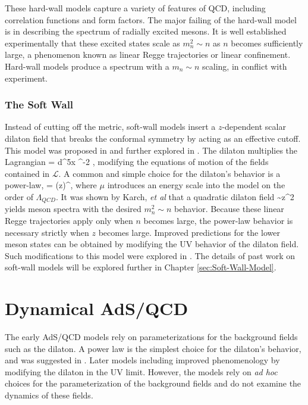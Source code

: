 These hard-wall models capture a variety of features of QCD, including correlation functions and form factors.
The major failing of the hard-wall model is in describing the spectrum of radially excited mesons.
It is well established experimentally that these excited states scale as $m_n^2 \sim n$ as $n$ becomes sufficiently large, a phenomenon known as linear Regge trajectories or linear confinement.
Hard-wall models produce a spectrum with a $m_n \sim n$ scaling, in conflict with experiment.

\subsubsection{The Soft Wall}
Instead of cutting off the metric, soft-wall models insert a $z$-dependent scalar dilaton field that breaks the conformal symmetry by acting as an effective cutoff.
This model was proposed in \cite{karch-katz-son-adsqcd} and further explored in \cite{Evans:2006ea,Grigoryan:2007my,kwee-lebed-pion,Cherman2009,colangelo2008,Huang:2007fv}. 
The dilaton multiplies the Lagrangian
\be
{} = \int d^5x ^{-2\Phi} \root  {},
\ee
modifying the equations of motion of the fields contained in $\mathcal{L}$. 
A common and simple choice for the dilaton's behavior is a power-law,
\be
\Phi = (\mu z)^\nu,
\ee
where $\mu$ introduces an energy scale into the model on the order of $\Lambda_{QCD}$.
It was shown by Karch, \emph{et al} \cite{karch-katz-son-adsqcd} that a quadratic dilaton field
\be
\Phi \sim z^2
\ee
yields meson spectra with the desired $m_n^2 \sim n$ behavior.
Because these linear Regge trajectories apply only when $n$ becomes large, the power-law behavior is necessary strictly when $z$ becomes large.
Improved predictions for the lower meson states can be obtained by modifying the UV behavior of the dilaton field.
Such modifications to this model were explored in \cite{gherghetta-kelley}.
The details of past work on soft-wall models will be explored further in Chapter \ref{sec:Soft-Wall-Model}.

\section{Dynamical AdS/QCD}
The early AdS/QCD models rely on parameterizations for the background fields such as the dilaton.
A power law is the simplest choice for the dilaton's behavior, and was suggested in \cite{karch-katz-son-adsqcd}.
Later models including \cite{gherghetta-kelley} improved phenomenology by modifying the dilaton in the UV limit.
However, the models rely on \emph{ad hoc} choices for the parameterization of the background fields and do not examine the dynamics of these fields.

